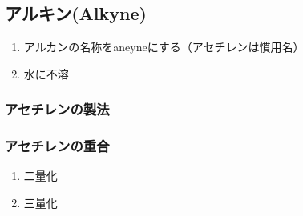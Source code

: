 \subsection{アルキン\:\:\:(Alkyne)}

\begin{enumerate}[label=$\cdot$]
  \item アルカンの名称をane\rightarrow yneにする（アセチレンは慣用名）
  \item 水に不溶
\end{enumerate}
\subsubsection*{アセチレンの製法}
\subsubsection*{アセチレンの重合}
\begin{enumerate}[label=$\cdot$]
  \item 二量化
  \item 三量化
\end{enumerate}

